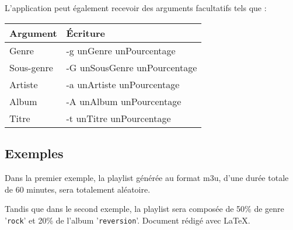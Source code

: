 \documentclass[a4paper,titlepage,oneside]{article}
\begin{document}
\\\\

L'application peut également recevoir des arguments facultatifs tels que :
\begin{center}
	\begin{tabularx}{8cm}{|X|l|}
		\hline
		\textbf{Argument} & \textbf{Écriture}\\
		\hline
		\hline
		Genre		& -g unGenre unPourcentage\\
		Sous-genre	& -G unSousGenre unPourcentage\\
		Artiste		& -a unArtiste unPourcentage\\
		Album		& -A unAlbum unPourcentage\\
		Titre		& -t unTitre unPourcentage\\
		\hline
	\end{tabularx}
\end{center}

\newpage
\subsection{Exemples}

Dans la premier exemple, la playlist générée au format m3u, d'une durée totale de 60 minutes, sera totalement aléatoire.

Tandis que dans le second exemple, la playlist sera composée de 50\% de genre '\texttt{rock}' et 20\% de l'album '\texttt{reversion}'.
\vfill
Document rédigé avec \LaTeX{}.
\end{document}
